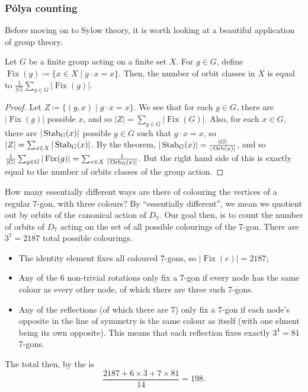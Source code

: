 \subsubsection{P\'olya counting}\label{sec:group-theory:polya-counting}
Before moving on to Sylow theory, it is worth looking at a beautiful application of group theory.

\begin{theorem} \label{thm:group-theory:polya-enumeration-theorem}
  Let \(G\) be a finite group acting on a finite set \(X\). For \(g \in G\), define \(\operatorname{Fix}(g) \coloneqq \{ x \in X \mid g \cdot x = x \}\). Then, the number of orbit classes in \(X\) is equal to \(\frac{1}{|G|} \sum_{g \in G} |\operatorname{Fix}(g)|\).
\end{theorem}

\begin{proof}
  Let \(Z \coloneqq \{(g, x) \mid g \cdot x = x\}\). We see that for each \(g \in G\), there are \(|\operatorname{Fix}(g)|\) possible \(x\), and so \(|Z| = \sum_{g \in G} |\operatorname{Fix}(G)|\). Also, for each \(x \in G\), there are \(|\operatorname{Stab}_{G}(x)|\) possible \(g \in G\) such that \(g \cdot x = x\), so \(|Z| = \sum_{x \in X} |\operatorname{Stab}_{G}(x)|\). By the  theorem, \(|\operatorname{Stab}_{G}(x)| = \frac{|G|}{|\operatorname{Orb}(x)|}\), and so \(\frac{1}{|G|} \sum_{g \in G} | \operatorname{Fix}(g)| = \sum_{x \in X} \frac{1}{|\operatorname{Orb}_{G}(x)|}\). But the right hand side of this is exactly equal to the number of orbits classes of the group action.
\end{proof}

\begin{example}
  How many essentially different ways are there of colouring the vertices of a regular 7-gon, with three colours? By ``essentially different'', we mean we quotient out by orbits of the canonical action of \(D_{7}\). Our goal then, is to count the number of orbits of \(D_{7}\) acting on the set of all possible colourings of the 7-gon. There are \(3^{7} = 2187\) total possible colourings.
  \begin{itemize}
  \item The identity element fixes all coloured 7-gons, so \(|\operatorname{Fix}(e)| = 2187\);
  \item Any of the 6 non-trivial rotations only fix a 7-gon if every node has the same colour as every other node, of which there are three such 7-gons.
  \item Any of the reflections (of which there are 7) only fix a 7-gon if each node's opposite in the line of symmetry is the same colour as itself (with one elment being its own opposite). This means that each reflection fixes exactly \(3^{4} = 81\) 7-gons.
  \end{itemize}

  The total then, by the  is
  \[\frac{2187 + 6 \times 3 + 7 \times 81}{14} = 198.\]
\end{example}

